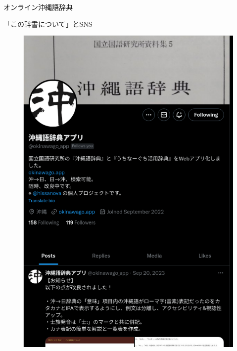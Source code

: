 \documentclass[14pt]{beamer}
\begin{document}
\begin{frame}{オンライン沖縄語辞典}
\begin{block}{「この辞書について」とSNS}
\begin{figure}[ht]
\begin{minipage}{0.4\textwidth}
        \includegraphics[height=0.4\paperheight]{okinawago-app-twitter-account.png}
      \end{minipage}
    \end{figure}
  \end{block}
\end{frame}
\end{document}
